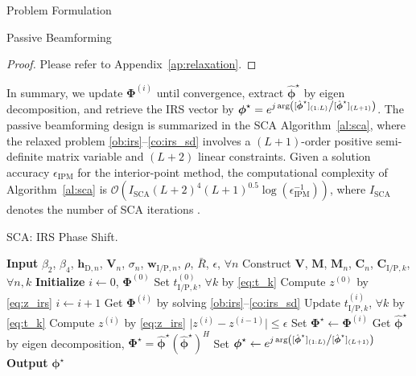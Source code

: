 \documentclass[journal]{IEEEtran}
\begin{document}
\begin{section}{Problem Formulation}
\begin{subsection}{Passive Beamforming}
			\begin{proof}\label{pf:relaxation}
				Please refer to Appendix~\ref{ap:relaxation}.
			\end{proof}

			In summary, we update $\boldsymbol{\Phi}^{(i)}$ until convergence, extract $\hat{\boldsymbol{\phi}}^\star$ by eigen decomposition, and retrieve the	IRS vector by $\boldsymbol{\phi}^{\star}=e^{j \arg\left([\hat{\boldsymbol{\phi}}^\star]_{(1:L)} \middle/ [\hat{\boldsymbol{\phi}}^\star]_{(L+1)}\right)}$. The passive beamforming design is summarized in the SCA Algorithm~\ref{al:sca}, where the relaxed problem \eqref{ob:irs}--\eqref{co:irs_sd} involves a $(L+1)$-order positive semi-definite matrix variable and $(L+2)$ linear constraints. Given a solution accuracy $\epsilon_{\mathrm{IPM}}$ for the interior-point method, the computational complexity of Algorithm~\ref{al:sca} is $\mathcal{O}\left(I_{\mathrm{SCA}}(L+2)^4 (L+1)^{0.5} \log(\epsilon_{\mathrm{IPM}}^{-1})\right)$, where $I_{\mathrm{SCA}}$ denotes the number of SCA iterations \cite{Luo2010b}.

			\begin{algorithm}[!t]
				\caption{SCA: IRS Phase Shift.}
				\label{al:sca}
				\begin{algorithmic}[1]
					\State \textbf{Input} $\beta_2$, $\beta_4$, $\boldsymbol{h}_{\mathrm{D},n}$, $\boldsymbol{V}_{n}$, $\sigma_n$, $\boldsymbol{w}_{\mathrm{I/P},n}$, $\rho$, $\bar{R}$, $\epsilon$, $\forall n$
					\State Construct $\boldsymbol{V}$, $\boldsymbol{M}$, $\boldsymbol{M}_n$, $\boldsymbol{C}_{n}$, $\boldsymbol{C}_{\mathrm{I/P},k}$, $\forall n,k$
					\State \textbf{Initialize} $i \gets 0$, $\boldsymbol{\Phi}^{(0)}$
					\State Set $t_{\mathrm{I/P},k}^{(0)}$, $\forall k$ by \eqref{eq:t_k}
					\State Compute $z^{(0)}$ by \eqref{eq:z_irs}
					\Repeat
						\State $i \gets i + 1$
						\State Get $\boldsymbol{\Phi}^{(i)}$ by solving \eqref{ob:irs}--\eqref{co:irs_sd}
						\State Update $t_{\mathrm{I/P},k}^{(i)}$, $\forall k$ by \eqref{eq:t_k}
						\State Compute $z^{(i)}$ by \eqref{eq:z_irs}
					\Until $\lvert z^{(i)}-z^{(i-1)} \rvert \le \epsilon$
					\State Set $\boldsymbol{\Phi}^{\star} \gets \boldsymbol{\Phi}^{(i)}$
					\State Get $\hat{\boldsymbol{\phi}}^\star$ by eigen decomposition, $\boldsymbol{\Phi}^{\star}=\hat{\boldsymbol{\phi}}^\star(\hat{\boldsymbol{\phi}}^\star)^H$
					\State Set $\boldsymbol{\phi}^{\star} \gets e^{j \arg\left([\hat{\boldsymbol{\phi}}^\star]_{(1:L)} \middle/ [\hat{\boldsymbol{\phi}}^\star]_{(L+1)}\right)}$
					\State \textbf{Output} $\boldsymbol{\phi}^{\star}$
				\end{algorithmic}
			\end{algorithm}


\end{subsection}
\end{section}
\end{document}
